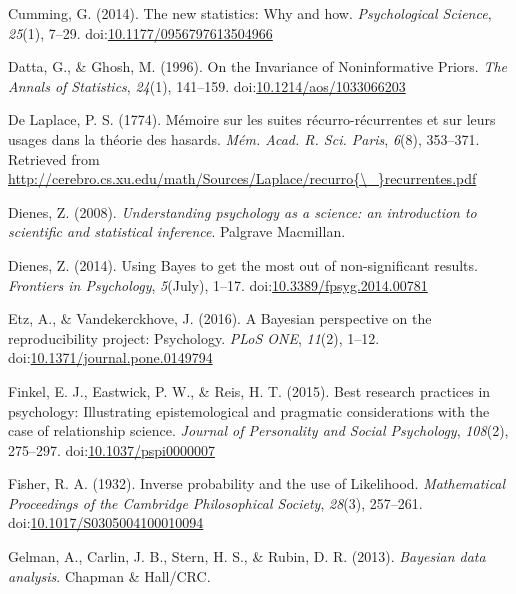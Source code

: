 \documentclass[english,man]{apa6}
\theoremstyle{definition}
\theoremstyle{definition}
\theoremstyle{definition}
\theoremstyle{remark}
\begin{document}
\hypertarget{ref-Cumming2014}{}
Cumming, G. (2014). The new statistics: Why and how. \emph{Psychological
Science}, \emph{25}(1), 7--29.
doi:\href{https://doi.org/10.1177/0956797613504966}{10.1177/0956797613504966}

\hypertarget{ref-Datta1996}{}
Datta, G., \& Ghosh, M. (1996). On the Invariance of Noninformative
Priors. \emph{The Annals of Statistics}, \emph{24}(1), 141--159.
doi:\href{https://doi.org/10.1214/aos/1033066203}{10.1214/aos/1033066203}

\hypertarget{ref-DeLaplace1774}{}
De Laplace, P. S. (1774). Mémoire sur les suites récurro-récurrentes et
sur leurs usages dans la théorie des hasards. \emph{Mém. Acad. R. Sci.
Paris}, \emph{6}(8), 353--371. Retrieved from
\href{http://cerebro.cs.xu.edu/math/Sources/Laplace/recurro\%7B/_\%7Drecurrentes.pdf}{http://cerebro.cs.xu.edu/math/Sources/Laplace/recurro\{\textbackslash{}\_\}recurrentes.pdf}

\hypertarget{ref-Dienes2008}{}
Dienes, Z. (2008). \emph{Understanding psychology as a science: an
introduction to scientific and statistical inference}. Palgrave
Macmillan.

\hypertarget{ref-Dienes2014}{}
Dienes, Z. (2014). Using Bayes to get the most out of non-significant
results. \emph{Frontiers in Psychology}, \emph{5}(July), 1--17.
doi:\href{https://doi.org/10.3389/fpsyg.2014.00781}{10.3389/fpsyg.2014.00781}

\hypertarget{ref-Etz2016}{}
Etz, A., \& Vandekerckhove, J. (2016). A Bayesian perspective on the
reproducibility project: Psychology. \emph{PLoS ONE}, \emph{11}(2),
1--12.
doi:\href{https://doi.org/10.1371/journal.pone.0149794}{10.1371/journal.pone.0149794}

\hypertarget{ref-Finkel2015}{}
Finkel, E. J., Eastwick, P. W., \& Reis, H. T. (2015). Best research
practices in psychology: Illustrating epistemological and pragmatic
considerations with the case of relationship science. \emph{Journal of
Personality and Social Psychology}, \emph{108}(2), 275--297.
doi:\href{https://doi.org/10.1037/pspi0000007}{10.1037/pspi0000007}

\hypertarget{ref-Fisher1932}{}
Fisher, R. A. (1932). Inverse probability and the use of Likelihood.
\emph{Mathematical Proceedings of the Cambridge Philosophical Society},
\emph{28}(3), 257--261.
doi:\href{https://doi.org/10.1017/S0305004100010094}{10.1017/S0305004100010094}

\hypertarget{ref-Gelman2004}{}
Gelman, A., Carlin, J. B., Stern, H. S., \& Rubin, D. R. (2013).
\emph{Bayesian data analysis}. Chapman \& Hall/CRC.
\end{document}
